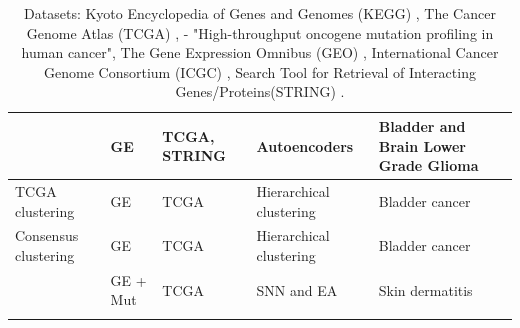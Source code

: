 {\begin{longtable}{|p{3cm}|p{1.8cm}|p{2.2cm}|p{2.8cm}|p{3.5cm}|}
\citet{Ma2019-hk} & GE & TCGA, STRING & Autoencoders &  Bladder and Brain Lower Grade Glioma \\ \hline
TCGA clustering & GE & TCGA & Hierarchical clustering & Bladder cancer  \\ \hline
Consensus clustering & GE & TCGA & Hierarchical clustering & Bladder cancer \\ \hline
\citet{Capecci2020-uj} & GE + Mut & TCGA & SNN and EA & Skin dermatitis  \\ \hline
\caption{Datasets: Kyoto Encyclopedia of Genes and Genomes (KEGG) \cite{Kanehisa2017-wj}, The Cancer Genome Atlas (TCGA) \cite{Tcga2018-sj}, \citet{Thomas2007-yj} - "High-throughput oncogene mutation profiling in human cancer", The Gene Expression Omnibus (GEO) \cite{Clough2016-zc, Davis2007-at}, International Cancer Genome Consortium (ICGC) \cite{International_Cancer_Genome_Consortium2010-ca}, Search Tool for Retrieval of Interacting Genes/Proteins(STRING) \cite{Szklarczyk2019-pu}.}
\label{tab:approaches}
\end{longtable}
}








